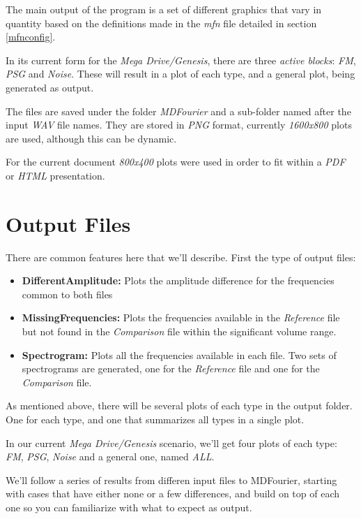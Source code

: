 \documentclass[10pt,a4paper]{report}
\begin{document}
The main output of the program is a set of different graphics that vary in quantity based on the definitions made in the \textit{mfn} file detailed in section \ref{mfnconfig}.

In its current form for the \textit{Mega Drive/Genesis}, there are three \textit{active blocks}: \textit{FM}, \textit{PSG} and \textit{Noise}. These will result in a plot of each type, and a general plot, being generated as output.

The files are saved under the folder \textit{MDFourier} and a sub-folder named after the input \textit{WAV} file names. They are stored in \textit{PNG}\cite{libpng} format, currently \textit{1600x800} plots are used, although this can be dynamic. 

For the current document \textit{800x400} plots were used in order to fit within a \textit{PDF} or \textit{HTML} presentation.

\section{Output Files}
\label{outputfiles}
There are common features here that we'll describe. First the type of output files: 

\begin{itemize}
	\item \textbf{DifferentAmplitude:} Plots the amplitude difference for the frequencies common to both files
	\item \textbf{MissingFrequencies:} Plots the frequencies available in the \textit{Reference} file but not found in the \textit{Comparison} file within the significant volume range.
	\item \textbf{Spectrogram:} Plots all the frequencies available in each file. Two sets of spectrograms are generated, one for the \textit{Reference} file and one for the \textit{Comparison} file.
\end{itemize}

As mentioned above, there will be several plots of each type in the output folder. One for each type, and one that summarizes all types in a single plot.

In our current\textit{ Mega Drive/Genesis} scenario, we'll get four plots of each type: \textit{FM}, \textit{PSG}, \textit{Noise} and a general one, named \textit{ALL}.

We'll follow a series of results from differen input files to MDFourier, starting with cases that have either none or a few differences, and build on top of each one so you can familiarize with what to expect as output.
\end{document}
